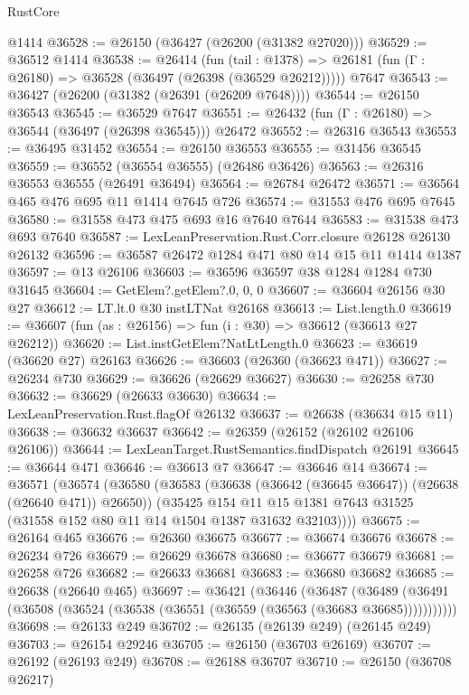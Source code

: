 \begin{lexlean}{RustCore}
\begin{coremodule}
    @1414
@36528 := @26150 (@36427 (@26200 (@31382 @27020)))
@36529 := @36512 @1414
@36538 := @26414
    (fun (tail : @1378) => @26181 (fun (Γ : @26180) => @36528 (@36497 (@26398 (@36529 @26212)))))
    @7647
@36543 := @36427 (@26200 (@31382 (@26391 (@26209 @7648))))
@36544 := @26150 @36543
@36545 := @36529 @7647
@36551 := @26432 (fun (Γ : @26180) => @36544 (@36497 (@26398 @36545))) @26472
@36552 := @26316 @36543
@36553 := @36495 @31452
@36554 := @26150 @36553
@36555 := @31456 @36545
@36559 := @36552 (@36554 @36555) (@26486 @36426)
@36563 := @26316 @36553 @36555 (@26491 @36494)
@36564 := @26784 @26472
@36571 := @36564 @465 @476 @695 @11 @1414 @7645 @726
@36574 := @31553 @476 @695 @7645
@36580 := @31558 @473 @475 @693 @16 @7640 @7644
@36583 := @31538 @473 @693 @7640
@36587 := LexLeanPreservation.Rust.Corr.closure @26128 @26130 @26132
@36596 := @36587 @26472 @1284 @471 @80 @14 @15 @11 @1414 @1387
@36597 := @13 @26106
@36603 := @36596 @36597 @38 @1284 @1284 @730 @31645
@36604 := GetElem?.getElem?.{0, 0, 0}
@36607 := @36604 @26156 @30 @27
@36612 := LT.lt.{0} @30 instLTNat @26168
@36613 := List.length.{0}
@36619 := @36607 (fun (as : @26156) => fun (i : @30) => @36612 (@36613 @27 @26212))
@36620 := List.instGetElem?NatLtLength.{0}
@36623 := @36619 (@36620 @27) @26163
@36626 := @36603 (@26360 (@36623 @471))
@36627 := @26234 @730
@36629 := @36626 (@26629 @36627)
@36630 := @26258 @730
@36632 := @36629 (@26633 @36630)
@36634 := LexLeanPreservation.Rust.flagOf @26132
@36637 := @26638 (@36634 @15 @11)
@36638 := @36632 @36637
@36642 := @26359 (@26152 (@26102 @26106 @26106))
@36644 := LexLeanTarget.RustSemantics.findDispatch @26191
@36645 := @36644 @471
@36646 := @36613 @7
@36647 := @36646 @14
@36674 := @36571
    (@36574
      (@36580
        (@36583 (@36638 (@36642 (@36645 @36647)) (@26638 (@26640 @471)) @26650))
        (@35425
          @154
          @11
          @15
          @1381
          @7643
          @31525
          (@31558 @152 @80 @11 @14 @1504 @1387 @31632 @32103))))
@36675 := @26164 @465
@36676 := @26360 @36675
@36677 := @36674 @36676
@36678 := @26234 @726
@36679 := @26629 @36678
@36680 := @36677 @36679
@36681 := @26258 @726
@36682 := @26633 @36681
@36683 := @36680 @36682
@36685 := @26638 (@26640 @465)
@36697 := @36421
    (@36446
      (@36487
        (@36489 (@36491 (@36508 (@36524 (@36538 (@36551 (@36559 (@36563 (@36683 @36685)))))))))))
@36698 := @26133 @249
@36702 := @26135 (@26139 @249) (@26145 @249)
@36703 := @26154 @29246
@36705 := @26150 (@36703 @26169)
@36707 := @26192 (@26193 @249)
@36708 := @26188 @36707
@36710 := @26150 (@36708 @26217)

\end{coremodule}
\end{lexlean}

